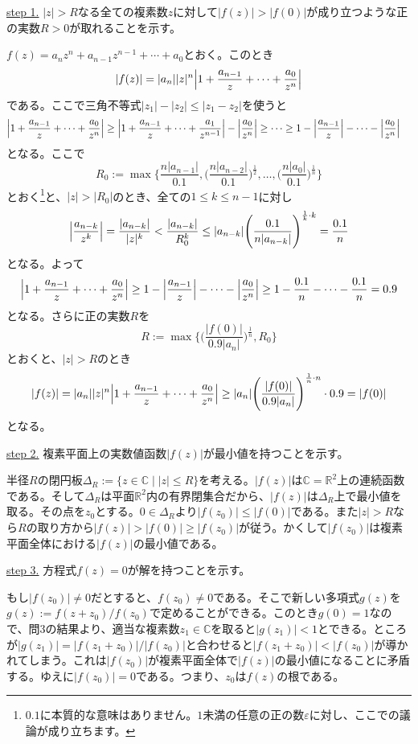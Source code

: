 \noindent \underline{step 1.} $|z|>R$なる全ての複素数$z$に対して$|f(z)|>|f(0)|$が成り立つような正の実数$R>0$が取れることを示す。

$f(z)=a_n z^n + a_{n-1} z^{n-1} + \cdots + a_0$とおく。このとき
\[
|f(z)| = |a_n||z|^n\Bigl|1+\frac{a_{n-1}}{z} + \cdots + \frac{a_0}{z^n}\Bigr|
\]
である。ここで三角不等式$|z_1|-|z_2|\leq|z_1-z_2|$を使うと
\begin{align*}
\Bigl|1+\frac{a_{n-1}}{z} + \cdots + \frac{a_0}{z^n}\Bigr|
&\geq \Bigl|1+\frac{a_{n-1}}{z} + \cdots + \frac{a_1}{z^{n-1}}\Bigr| - \Bigl|\frac{a_0}{z^n}\Bigr| \geq \cdots
\geq 1-\Bigl|\frac{a_{n-1}}{z}\Bigr| - \cdots -\Bigl|\frac{a_{0}}{z^n}\Bigr|
\end{align*}
となる。ここで
\[
R_0:=\max\Biggl\{\frac{n|a_{n-1}|}{0.1},\Biggl(\frac{n|a_{n-2}|}{0.1}\Biggr)^{\frac{1}{2}},\ldots,\Biggl(\frac{n|a_{0}|}{0.1}\Biggr)^{\frac{1}{n}}\Biggr\}
\]
とおく\footnote{$0.1$に本質的な意味はありません。$1$未満の任意の正の数$\varepsilon$に対し、ここでの議論が成り立ちます。}と、$|z|>|R_0|$のとき、全ての$1\leq k\leq n-1$に対し
\[
\Bigl|\frac{a_{n-k}}{z^k}\Bigr| = \frac{|a_{n-k}|}{|z|^k} < \frac{|a_{n-k}|}{R_0^k} \leq |a_{n-k}|\Biggl(\frac{0.1}{n|a_{n-k}|}\Biggr)^{\frac{1}{k}\cdot k} = \frac{0.1}{n}
\]
となる。よって
\[
\Bigl|1+\frac{a_{n-1}}{z} + \cdots + \frac{a_0}{z^n}\Bigr| \geq
1-\Bigl|\frac{a_{n-1}}{z}\Bigr| - \cdots -\Bigl|\frac{a_{0}}{z^n}\Bigr|
\geq 1-\frac{0.1}{n}-\cdots-\frac{0.1}{n} = 0.9
\]
となる。さらに正の実数$R$を
\[
R:=\max\Biggl\{\Biggl(\frac{|f(0)|}{0.9|a_n|}\Biggr)^{\frac{1}{n}},R_0\Biggr\}
\]
とおくと、$|z|>R$のとき
\[
|f(z)| = |a_n||z|^n\Bigl|1+\frac{a_{n-1}}{z} + \cdots + \frac{a_0}{z^n}\Bigr| \geq |a_n|\Biggl(\frac{|f(0)|}{0.9|a_n|}\Biggr)^{\frac{1}{n}\cdot n} \cdot 0.9 = |f(0)|
\]
となる。

\noindent \underline{step 2.} 複素平面上の実数値函数$|f(z)|$が最小値を持つことを示す。

半径$R$の閉円板$\Delta_R:=\{z\in\mathbb{C}\mid |z|\leq R\}$を考える。$|f(z)|$は$\mathbb{C}=\mathbb{R}^2$上の連続函数である。そして$\Delta_R$は平面$\mathbb{R}^2$内の有界閉集合だから、$|f(z)|$は$\Delta_R$上で最小値を取る。その点を$z_0$とする。$0\in\Delta_R$より$|f(z_0)|\leq |f(0)|$である。また$|z|>R$なら$R$の取り方から$|f(z)|>|f(0)|\geq|f(z_0)|$が従う。かくして$|f(z_0)|$は複素平面全体における$|f(z)|$の最小値である。

\noindent \underline{step 3.} 方程式$f(z)=0$が解を持つことを示す。

もし$|f(z_0)|\neq 0$だとすると、$f(z_0)\neq 0$である。そこで新しい多項式$g(z)$を$g(z):=f(z+z_0)/f(z_0)$で定めることができる。このとき$g(0)=1$なので、問3の結果より、適当な複素数$z_1\in\mathbb{C}$を取ると$|g(z_1)|<1$とできる。ところが$|g(z_1)| = |f(z_1+z_0)| / |f(z_0)|$と合わせると$|f(z_1+z_0)| < |f(z_0)|$が導かれてしまう。これは$|f(z_0)|$が複素平面全体で$|f(z)|$の最小値になることに矛盾する。ゆえに$|f(z_0)|=0$である。つまり、$z_0$は$f(z)$の根である。

